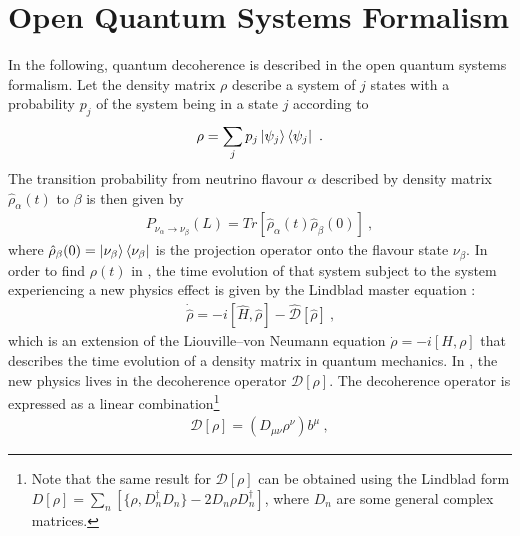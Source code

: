 \section{Open Quantum Systems Formalism}\label{subsec:oqsf} 
%
In the following, quantum decoherence is described in the open quantum systems formalism. Let the density matrix $\rho$ describe a system of $j$ states with a probability $p_j$ of the system being in a state $j$ according to
\vspace{-3mm}%
%
\begin{align} \label{density-matrix}
    \rho = \sum_j p_j \ket{\psi_j}\bra{\psi_j} \ .
\end{align}
%
The transition probability from neutrino flavour $\alpha$ described by density matrix $\hat{\rho}_\alpha(t)$ to $\beta$ is then given by
\vspace{-3mm}%
\begin{align} \label{eq:open_sys_osc_prob}
    P_{\nu_\alpha\rightarrow \nu_\beta}(L) = Tr[\hat{\rho}_\alpha(t)\hat{\rho}_\beta(0)] \ ,
\end{align}
%
where $\hat{\rho}_\beta(0)=\ket{\nu_\beta}\bra{\nu_\beta}$ is the projection operator onto the flavour state $\nu_\beta$. In order to find $\rho(t)$ in , the time evolution of that system subject to the system experiencing a new physics effect is given by the Lindblad master equation \cite{Lindblad:1975ef}:
\vspace{-3mm}
%
\begin{align} \label{eq:lindblad-master-eq}
    \dot{\hat{\rho}} = -i[\hat{H},\hat{\rho}] - \hat{\mathcal{D}}[\hat{\rho}] \ \text{,}
\end{align}
%
which is an extension of the Liouville–von Neumann equation $\dot{\rho} = -i[H,\rho]$ that describes the time evolution of a density matrix in quantum mechanics. In , the new physics lives in the decoherence operator $\mathcal{D}[\rho]$.
The decoherence operator is expressed as a linear combination\footnote{Note that the same result for $\mathcal{D}[\rho]$ can be obtained using the Lindblad form \cite{Farzan:2008zv} $D[\rho] = \sum_n \left[ \{ \rho, D_n^\dagger D_n \} - 2 D_n \rho D_n^\dagger \right]$, where $D_n$ are some general complex matrices.}
\vspace{-3mm}
%
\begin{align} \label{eq:decoherence-operator}
   \mathcal{D}[\rho] = (D_{\mu\nu}\rho^\nu)b^\mu \ ,
\end{align}

